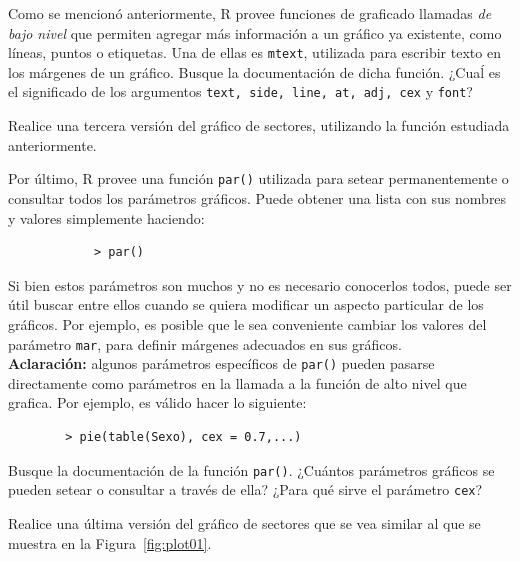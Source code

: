\documentclass{prob}
\begin{document}
\begin{problema}
	\begin{parte}
		Como se mencionó anteriormente, R provee funciones de graficado llamadas \textit{de bajo nivel} que permiten agregar más información a un gráfico ya existente, como líneas, puntos o etiquetas. Una de ellas es \texttt{mtext}, utilizada para escribir texto en los márgenes de un gráfico. Busque la documentación de dicha función. ¿Cuaĺ es el significado de los argumentos \texttt{text, side, line, at, adj, cex} y \texttt{font}? 
	\end{parte}
	
	\begin{parte}
		Realice una tercera versión del gráfico de sectores, utilizando la función estudiada anteriormente.
	\end{parte}
	
	\begin{parte}
		Por último, R provee una función \texttt{par()} utilizada para setear permanentemente o consultar todos los parámetros gráficos. Puede obtener una lista con sus nombres y valores simplemente haciendo:
		\begin{verbatim}
		    > par()
		\end{verbatim}
	Si bien estos parámetros son muchos y no es necesario conocerlos todos, puede ser útil buscar entre ellos cuando se quiera modificar un aspecto particular de los gráficos. Por ejemplo, es posible que le sea conveniente cambiar los valores del parámetro \texttt{mar}, para definir márgenes adecuados en sus gráficos. \\
	
	\textbf{Aclaración:} algunos parámetros específicos de \texttt{par()} pueden pasarse directamente como parámetros en la llamada a la función de alto nivel que grafica. Por ejemplo, es válido hacer lo siguiente:
	\begin{verbatim}
	    > pie(table(Sexo), cex = 0.7,...)
	\end{verbatim}
\medskip	
	Busque la documentación de la función \texttt{par()}. ¿Cuántos parámetros gráficos se pueden setear o consultar a través de ella? ¿Para qué sirve el parámetro \texttt{cex}?
	\end{parte}
		
	\begin{parte}	
	Realice una última versión del gráfico de sectores que se vea similar al que se muestra en la Figura~\ref{fig:plot01}.
	\end{parte}

	\end{problema}
	
\end{document}
